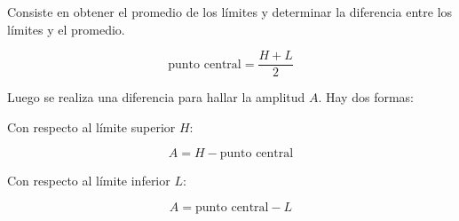 Consiste en obtener el promedio de los límites y determinar la diferencia entre los límites y el promedio.

\[
  \text{punto central} = \dfrac{H+L}{2}
\]

Luego se realiza una diferencia para hallar la amplitud $A$. Hay dos formas:

Con respecto al límite superior $H$:

\[
  A = H - \text{punto central}
\]

Con respecto al límite inferior $L$:

\[
  A = \text{punto central} - L
\]
